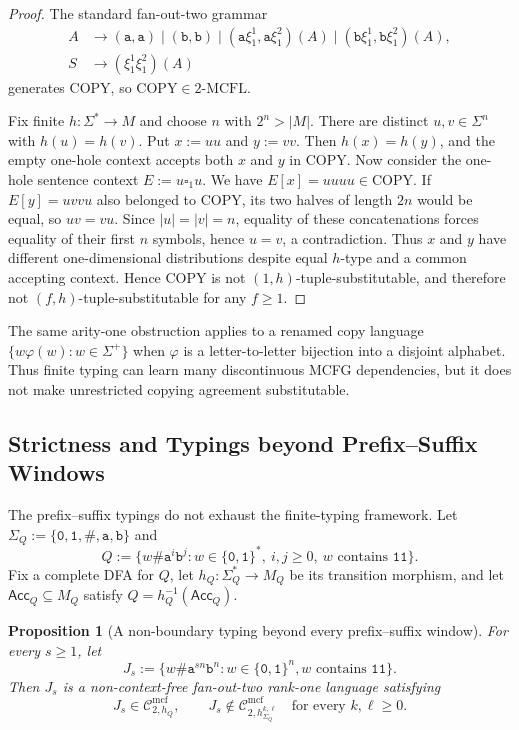 \documentclass[11pt]{article}
\numberwithin{equation}{section}
\theoremstyle{plain}
\newtheorem{proposition}[theorem]{Proposition}
\theoremstyle{definition}
\theoremstyle{remark}
\newcommand{\Cmcf}[2]{\mathcal{C}^{\mathrm{mcf}}_{#1,#2}}
\newcommand{\blank}{\square}
\begin{document}
\begin{proof}
The standard fan-out-two grammar
\[
\begin{aligned}
 A&\to(\mathtt a,\mathtt a)\mid(\mathtt b,\mathtt b)
      \mid(\mathtt a \xi_1^1,\mathtt a \xi_1^2)(A)
      \mid(\mathtt b \xi_1^1,\mathtt b \xi_1^2)(A),\\
 S&\to(\xi_1^1\xi_1^2)(A)
\end{aligned}
\]
generates COPY, so $\mathrm{COPY}\in2\text{-}\mathrm{MCFL}$.

Fix finite $h:\Sigma^*\to M$ and choose $n$ with $2^n>|M|$.
There are distinct $u,v\in\Sigma^n$ with $h(u)=h(v)$.  Put
$x:=uu$ and $y:=vv$.  Then $h(x)=h(y)$, and the empty one-hole context accepts
both $x$ and $y$ in COPY.  Now consider the one-hole sentence context
$E:=u\blank_1u$.  We have
$E[x]=uuuu\in\mathrm{COPY}$.  If $E[y]=uvvu$ also belonged to COPY, its two
halves of length $2n$ would be equal, so $uv=vu$.  Since $|u|=|v|=n$, equality
of these concatenations forces equality of their first $n$ symbols, hence
$u=v$, a contradiction.  Thus $x$ and $y$ have different one-dimensional
distributions despite equal $h$-type and a common accepting context.  Hence
COPY is not $(1,h)$-tuple-substitutable, and therefore not $(f,h)$-tuple-substitutable
for any $f\ge1$.
\end{proof}

The same arity-one obstruction applies to a renamed copy language
$\{w\varphi(w):w\in\Sigma^+\}$ when $\varphi$ is a letter-to-letter bijection
into a disjoint alphabet.  Thus finite typing can learn many discontinuous
MCFG dependencies, but it does not make unrestricted copying agreement
substitutable.

\subsection{Strictness and Typings beyond Prefix--Suffix Windows}
\label{subsec:comparison-separations}

The prefix--suffix typings do not exhaust the finite-typing framework.
Let $\Sigma_Q:=\{\mathtt 0,\mathtt 1,\mathtt\#,\mathtt a,\mathtt b\}$ and
\[
  Q:=\{w\mathtt\#\mathtt a^i\mathtt b^j:w\in\{\mathtt 0,\mathtt 1\}^*,\ i,j\ge0,\ \text{$w$ contains $\mathtt{11}$}\}.
\]
Fix a complete DFA for $Q$, let $h_Q:\Sigma_Q^*\to M_Q$ be its transition
morphism, and let $\mathsf{Acc}_Q\subseteq M_Q$ satisfy $Q=h_Q^{-1}(\mathsf{Acc}_Q)$.

\begin{proposition}[A non-boundary typing beyond every prefix--suffix window]
\label{prop:nonboundary-rankone-separator}
For every $s\ge1$, let
\[
 J_s:=\{w\mathtt\#\mathtt a^{sn}\mathtt b^n:
       w\in\{\mathtt 0,\mathtt 1\}^n,
       \text{$w$ contains $\mathtt{11}$}\}.
\]
Then $J_s$ is a non-context-free fan-out-two rank-one language satisfying
\[
  J_s\in\Cmcf{2}{h_Q},
  \qquad
  J_s\notin\Cmcf{2}{h_{\Sigma_Q}^{k,\ell}}
  \quad\text{for every }k,\ell\ge0.
\]
\end{proposition}
\end{document}
